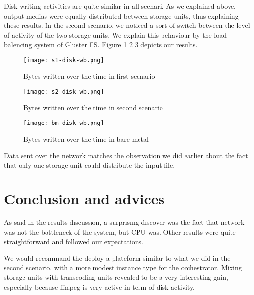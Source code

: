 \documentclass[a4paper, titlepage]{paper}
\numberwithin{figure}{section}
\numberwithin{table}{section}
\begin{document}
        Disk writing activities are quite similar in all scenari. As we explained above, output medias were equally distributed between storage units, thus explaining these results. In the second scenario, we noticed a sort of switch between the level of activity of the two storage units. We explain this behaviour by the load balencing system of Gluster FS. Figure \ref{s1dbw} \ref{s2dbw} \ref{bmdbw} depicts our results.

        \begin{figure}
          \centering
          \texttt{[image: s1-disk-wb.png]}
          \caption{Bytes written over the time in first scenario}
          \label{s1dbw}
        \end{figure}
        \begin{figure}
          \centering
          \texttt{[image: s2-disk-wb.png]}
          \caption{Bytes written over the time in second scenario}
          \label{s2dbw}
        \end{figure}
        \begin{figure}
          \centering
          \texttt{[image: bm-disk-wb.png]}
          \caption{Bytes written over the time in bare metal}
          \label{bmdbw}
        \end{figure}

        Data sent over the network matches the observation we did earlier about the fact that only one storage unit could distribute the input file.

  \section{Conclusion and advices}
    As said in the results discussion, a surprising discover was the fact that network was not the bottleneck of the system, but CPU was. Other results were quite straightforward and followed our expectations.

    We would recommand the deploy a plateform similar to what we did in the second scenario, with a more modest instance type for the orchestrator. Mixing storage units with transcoding units revealed to be a very interesting gain, especially because ffmpeg is very active in term of disk activity.
\end{document}
